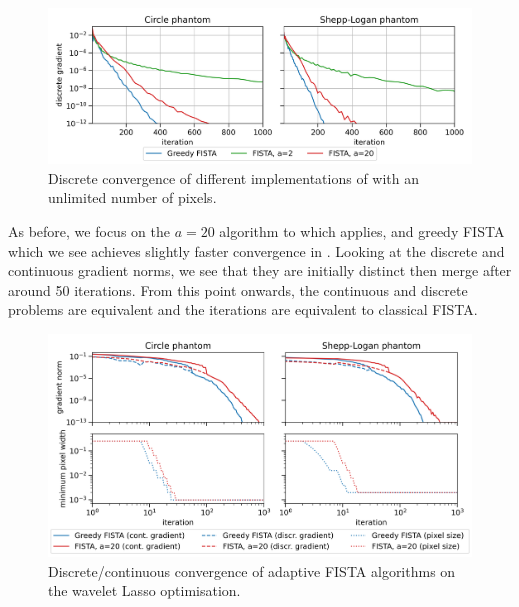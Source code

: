 \documentclass[10pt,a4paper,onecolumn]{article}
\numberwithin{equation}{section}
\begin{document}
\begin{figure}\centering
	\includegraphics[width=.84\textwidth]{haar_convergence_short}
	\caption{Discrete convergence of different implementations of  with an unlimited number of pixels.}\label{fig: haar convergence}
\end{figure}

As before, we focus on the $a=20$ algorithm to which  applies, and greedy FISTA which we see achieves slightly faster convergence in . Looking at the discrete and continuous gradient norms, we see that they are initially distinct then merge after around 50 iterations. From this point onwards, the continuous and discrete problems are equivalent and the iterations are equivalent to classical FISTA.

\begin{figure}[H]\centering
	\includegraphics[width=.84\textwidth]{haar_reduced_convergence}
	\caption{Discrete/continuous convergence of adaptive FISTA algorithms on the wavelet Lasso optimisation.}\label{fig: haar convergence zoom}
\end{figure}
\end{document}
